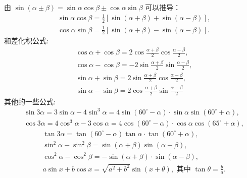 由 $\sin (\alpha \pm \beta)=\sin \alpha \cos \beta \pm \cos \alpha \sin \beta$ 可以推导：
$$
\begin{aligned}
& \sin \alpha \cos \beta=\frac{1}{2}[\sin (\alpha+\beta)+\sin (\alpha-\beta)], \\
& \cos \alpha \sin \beta=\frac{1}{2}[\sin (\alpha+\beta)-\sin (\alpha-\beta)] .
\end{aligned}
$$
和差化积公式:
$$
\begin{aligned}
& \cos \alpha+\cos \beta=2 \cos \frac{\alpha+\beta}{2} \cos \frac{\alpha-\beta}{2}, \\
& \cos \alpha-\cos \beta=-2 \sin \frac{\alpha+\beta}{2} \sin \frac{\alpha-\beta}{2}, \\
& \sin \alpha+\sin \beta=2 \sin \frac{\alpha+\beta}{2} \cos \frac{\alpha-\beta}{2}, \\
& \sin \alpha-\sin \beta=2 \cos \frac{\alpha+\beta}{2} \sin \frac{\alpha-\beta}{2}
\end{aligned}
$$
其他的一些公式:
$$
\begin{aligned}
& \sin 3 \alpha=3 \sin \alpha-4 \sin ^3 \alpha=4 \sin \left(60^{\circ}-\alpha\right) \cdot \sin \alpha \sin \left(60^{\circ}+\alpha\right), \\
& \cos 3 \alpha=4 \cos ^3 \alpha-3 \cos \alpha=4 \cos \left(60^{\circ}-\alpha\right) \cdot \cos \alpha \cos \left(65^{\circ}+\alpha\right),
\end{aligned}
$$
$$
\begin{aligned}
& \tan 3 \alpha=\tan \left(60^{\circ}-\alpha\right) \tan \alpha \cdot \tan \left(60^{\circ}+\alpha\right), \\
& \sin ^2 \alpha-\sin ^2 \beta=\sin (\alpha+\beta) \sin (\alpha-\beta), \\
& \cos ^2 \alpha-\cos ^2 \beta=-\sin (\alpha+\beta) \cdot \sin (\alpha-\beta), \\
& a \sin x+b \cos x=\sqrt{a^2+b^2} \sin (x+\theta), \text { 其中 } \tan \theta=\frac{b}{a} .
\end{aligned}
$$



